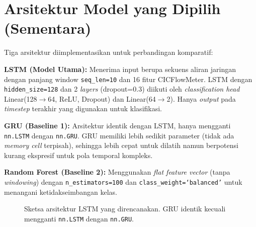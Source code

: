 \documentclass[11pt,a4paper,oneside]{report}
\begin{document}
\section{Arsitektur Model yang Dipilih (Sementara)}

Tiga arsitektur diimplementasikan untuk perbandingan komparatif:

\textbf{LSTM (Model Utama):} Menerima input berupa sekuens aliran jaringan dengan panjang window \texttt{seq\_len=10} dan 16 fitur CICFlowMeter. LSTM dengan \texttt{hidden\_size=128} dan 2 \textit{layers} (dropout=0.3) diikuti oleh \textit{classification head} Linear(128$\to$64, ReLU, Dropout) dan Linear(64$\to$2). Hanya \textit{output} pada \textit{timestep} terakhir yang digunakan untuk klasifikasi.

\textbf{GRU (Baseline 1):} Arsitektur identik dengan LSTM, hanya mengganti \texttt{nn.LSTM} dengan \texttt{nn.GRU}. GRU memiliki lebih sedikit parameter (tidak ada \textit{memory cell} terpisah), sehingga lebih cepat untuk dilatih namun berpotensi kurang ekspresif untuk pola temporal kompleks.

\textbf{Random Forest (Baseline 2):} Menggunakan \textit{flat feature vector} (tanpa \textit{windowing}) dengan \texttt{n\_estimators=100} dan \texttt{class\_weight=`balanced'} untuk menangani ketidakseimbangan kelas.

\begin{figure}[h!]
\centering
{}
\caption{Sketsa arsitektur LSTM yang direncanakan. GRU identik kecuali mengganti \texttt{nn.LSTM} dengan \texttt{nn.GRU}.}
\label{fig:arsitektur-sementara}
\end{figure}
\end{document}
